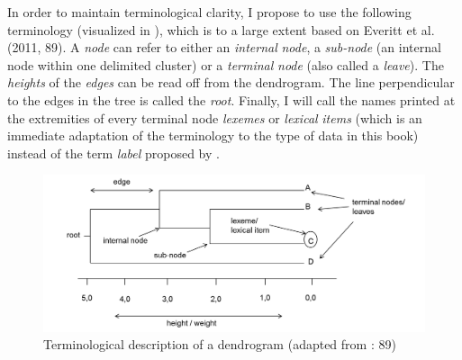 In order to maintain terminological clarity, I propose to use the following terminology (visualized in ), which is to a large extent based on Everitt et al. (2011, 89). A \textit{node} can refer to either an \textit{internal} \textit{node}, a \textit{sub-node} (an internal node within one delimited cluster) or a \textit{terminal} \textit{node} (also called a \textit{leave}). The \textit{heights} of the \textit{edges} can be read off from the dendrogram. The line perpendicular to the edges in the tree is called the \textit{root}. Finally, I will call the names printed at the extremities of every terminal node \textit{lexemes} or \textit{lexical} \textit{items} (which is an immediate adaptation of the terminology to the type of data in this book) instead of the term \textit{label} proposed by \citet{everitt_cluster_2011}. 


\begin{figure}
\includegraphics[height=.3\textheight]{figures/Vandevoorde2-img27.png}
\caption{\label{fig:key:27}  Terminological description of a dendrogram (adapted from \citealt{everitt_cluster_2011}: 89)}
\end{figure}


